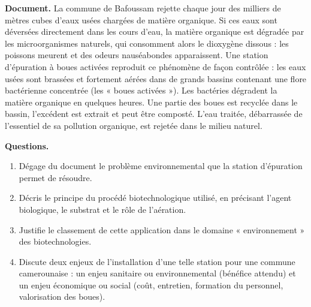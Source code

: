 \documentclass[11pt]{article}
\newcommand{\cle}[1]{{\popxbold\color{popdark}#1}}
\begin{document}
\begin{exercice}
\textbf{Document.} La commune de Bafoussam rejette chaque jour des milliers de mètres cubes d'eaux usées chargées de matière organique. Si ces eaux sont déversées directement dans les cours d'eau, la matière organique est dégradée par les microorganismes naturels, qui consomment alors le dioxygène dissous : les poissons meurent et des odeurs nauséabondes apparaissent. Une station d'épuration à \cle{boues activées} reproduit ce phénomène de façon contrôlée : les eaux usées sont brassées et fortement aérées dans de grands bassins contenant une flore bactérienne concentrée (les « boues activées »). Les bactéries dégradent la matière organique en quelques heures. Une partie des boues est recyclée dans le bassin, l'excédent est extrait et peut être composté. L'eau traitée, débarrassée de l'essentiel de sa pollution organique, est rejetée dans le milieu naturel.

\textbf{Questions.}
\begin{enumerate}
\item Dégage du document le problème environnemental que la station d'épuration permet de résoudre.
\item Décris le principe du procédé biotechnologique utilisé, en précisant l'agent biologique, le substrat et le rôle de l'aération.
\item Justifie le classement de cette application dans le domaine « environnement » des biotechnologies.
\item Discute deux enjeux de l'installation d'une telle station pour une commune camerounaise : un enjeu sanitaire ou environnemental (bénéfice attendu) et un enjeu économique ou social (coût, entretien, formation du personnel, valorisation des boues).
\end{enumerate}
\end{exercice}
\end{document}
